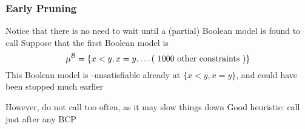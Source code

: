 \begin{frame}
\begin{columns}
    \begin{column}{5cm}
      \begin{overlayarea}{5cm}{5cm}
	\only<1|handout:0>{\scalebox{.6}{}}
	\only<2|handout:0>{\scalebox{.6}{}}
	\only<3,4,5|handout:0>{\scalebox{.6}{}}
	\only<6,7|handout:0>{\scalebox{.6}{}}
	\only<8|handout:0>{\scalebox{.6}{}}
	\only<9|handout:0>{\scalebox{.6}{}}
	\only<10-12|handout:0>{\scalebox{.6}{}}
	\only<13->{\scalebox{.6}{}}
      \end{overlayarea}
    \end{column}

  \end{columns}

\end{frame}

\begin{frame}
  \frametitle{Early Pruning}

  \scriptsize

  Notice that there is no need to wait until a (partial) Boolean model is found to
  call \tsolver 
  \vfill
  Suppose that the first Boolean model is 
  $$\mu^{\mathcal{B}} = \{ x < y, x = y, \ldots (\mbox{ 1000 other constraints }) \}$$ 
  This Boolean model is \T-unsatisfiable already at $\{ x < y, x = y \}$, and could have been stopped much earlier
  \vfill
  \pause
  \begin{center}
  \scalebox{.3}{}
  \end{center}
  \vfill
  \pause
  However, do not call \tsolver too often, as it may slow things down
  \vfill
  Good heuristic: call \tsolver just after any BCP

\end{frame}


